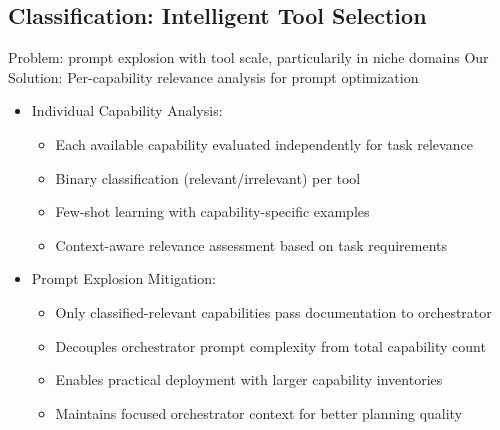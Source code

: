 \subsection{Classification: Intelligent Tool Selection}
\label{sec:classification}
Problem: prompt explosion with tool scale, particularily in niche domains
Our Solution: Per-capability relevance analysis for prompt optimization
\begin{itemize}
    \item Individual Capability Analysis:
    \begin{itemize}
        \item Each available capability evaluated independently for task relevance
        \item Binary classification (relevant/irrelevant) per tool
        \item Few-shot learning with capability-specific examples
        \item Context-aware relevance assessment based on task requirements
    \end{itemize}
    \item Prompt Explosion Mitigation:
    \begin{itemize}
        \item Only classified-relevant capabilities pass documentation to orchestrator
        \item Decouples orchestrator prompt complexity from total capability count
        \item Enables practical deployment with larger capability inventories
        \item Maintains focused orchestrator context for better planning quality
    \end{itemize}
\end{itemize}



